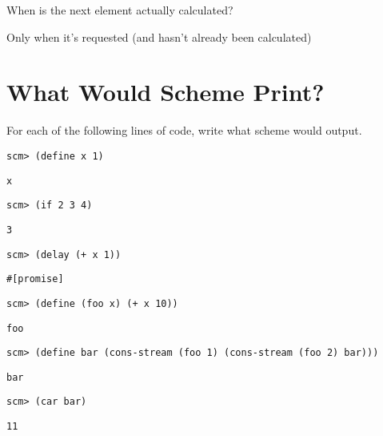 \documentclass{exam}
\begin{document}
\begin{questions}
\begin{blocksection}
\question When is the next element actually calculated?
\begin{solution}[.5in]
Only when it's requested (and hasn't already been calculated)
\end{solution}
\end{blocksection}


\section{What Would Scheme Print?}
\begin{blocksection}
\question For each of the following lines of code, write what scheme would output.

\begin{lstlisting}
scm> (define x 1)
\end{lstlisting}
\begin{solution}[.5in]
\texttt{x}
\end{solution}

\begin{lstlisting}
scm> (if 2 3 4)
\end{lstlisting}
\begin{solution}[.5in]
\texttt{3}
\end{solution}

\begin{lstlisting}
scm> (delay (+ x 1))
\end{lstlisting}
\begin{solution}[.5in]
\begin{lstlisting}
#[promise]
\end{lstlisting}
\end{solution}

\begin{lstlisting}
scm> (define (foo x) (+ x 10))
\end{lstlisting}
\begin{solution}[.5in]
\texttt{foo}
\end{solution}

\begin{lstlisting}
scm> (define bar (cons-stream (foo 1) (cons-stream (foo 2) bar)))
\end{lstlisting}
\begin{solution}[.5in]
\texttt{bar}
\end{solution}
\end{blocksection}

\begin{blocksection}
\begin{lstlisting}
scm> (car bar)
\end{lstlisting}
\begin{solution}[.5in]
\texttt{11}
\end{solution}


\end{blocksection}
\end{questions}
\end{document}
